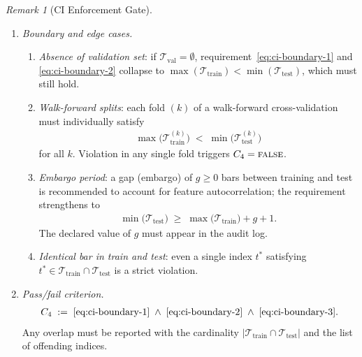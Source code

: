 \documentclass[12pt,openany]{book}
\numberwithin{equation}{chapter}
\theoremstyle{plain}
\theoremstyle{definition}
\theoremstyle{remark}
\newtheorem{remark}[theorem]{Remark}
\numberwithin{equation}{chapter}
\theoremstyle{plain}
\begin{document}
\begin{remark}[CI Enforcement Gate]
\begin{enumerate}
\begin{enumerate}
    \item \emph{Boundary and edge cases.}
    \begin{enumerate}
      \item \emph{Absence of validation set}: if
            $\mathcal{T}_{\mathrm{val}} = \emptyset$,
            requirement~\eqref{eq:ci-boundary-1} and
            \eqref{eq:ci-boundary-2} collapse to
            $\max(\mathcal{T}_{\mathrm{train}}) <
            \min(\mathcal{T}_{\mathrm{test}})$, which must
            still hold.
      \item \emph{Walk-forward splits}: each fold
            $(k)$ of a walk-forward cross-validation must
            individually satisfy
            \begin{align}
              \max\!\bigl(
              \mathcal{T}_{\mathrm{train}}^{(k)}\bigr)
              \;<\;
              \min\!\bigl(
              \mathcal{T}_{\mathrm{test}}^{(k)}\bigr)
              \label{eq:ci-walkforward}
            \end{align}
            for all $k$.  Violation in any single fold
            triggers $C_{4} = \textsc{false}$.
      \item \emph{Embargo period}: a gap (embargo) of
            $g \geq 0$ bars between training and test is
            recommended to account for feature autocorrelation;
            the requirement strengthens to
            \begin{align}
              \min\!\bigl(\mathcal{T}_{\mathrm{test}}\bigr)
              \;\geq\;
              \max\!\bigl(\mathcal{T}_{\mathrm{train}}\bigr)
              + g + 1.
              \label{eq:ci-embargo}
            \end{align}
            The declared value of $g$ must appear in the
            audit log.
      \item \emph{Identical bar in train and test}: even a
            single index $t^{*}$ satisfying
            $t^{*} \in \mathcal{T}_{\mathrm{train}} \cap
            \mathcal{T}_{\mathrm{test}}$ is a strict
            violation.
    \end{enumerate}

    \item \emph{Pass/fail criterion.}
          \begin{align}
            C_{4} \;:=\;
            \eqref{eq:ci-boundary-1}
            \;\wedge\;
            \eqref{eq:ci-boundary-2}
            \;\wedge\;
            \eqref{eq:ci-boundary-3}.
            \label{eq:c4-def}
          \end{align}
          Any overlap must be reported with the cardinality
          $|\mathcal{T}_{\mathrm{train}} \cap
          \mathcal{T}_{\mathrm{test}}|$ and the list of
          offending indices.


\end{enumerate}
\end{enumerate}
\end{remark}
\end{document}
